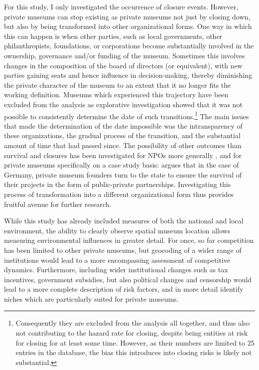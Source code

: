 \documentclass[12pt]{article}
\begin{document}
For this study, I only investigated the occurrence of closure events.
However, private museums can stop existing as private museums not just by closing down, but also by being transformed into other organizational forms.
One way in which this can happen is when other parties, such as local governments, other philanthropists, foundations, or corporations become substantially involved in the ownership, governance and/or funding of the museum.
Sometimes this involves changes in the composition of the board of directors (or equivalent), with new parties gaining seats and hence influence in decision-making, thereby diminishing the private character of the museum to an extent that it no longer fits the working definition.
Museums which experienced this trajectory have been excluded from the analysis as explorative investigation showed that it was not possible to consistently determine the date of such transitions.\footnote{Consequently they are excluded from the analysis all together, and thus also not contributing to the hazard rate for closing, despite being entities at risk for closing for at least some time. However, as their numbers are limited to 25 entries in the database, the bias this introduces into closing risks is likely not substantial.}
The main issues that made the determination of the date impossible was the intransparency of these organizations, the gradual process of the transition, and the substantial amount of time that had passed since.
The possibility of other outcomes than survival and closures has been investigated for NPOs more generally
\parencite{Searing_2020_zombies,HernandezOrtiz_2022_discontinuity,Helmig_Ingerfurth_Pinz_2013_nonprofit}, and for private museums specifically on a case study basis: 
\textcite{Walker_2019_collector} argues that in the case of Germany, private museum founders turn to the state to ensure the survival of their projects in the form of public-private partnerships.
Investigating this process of transformation into a different organizational form thus provides fruitful avenue for further research. 


While this study has already included measures of both the national and local environment, the ability to clearly observe spatial museum location allows measuring environmental influences in greater detail.
For once, so far competition has been limited to other private museums, but geocoding of a wider range of institutions would lead to a more encompassing assessment of competitive dynamics.
Furthermore, including wider institutional changes such as tax incentives, government subsidies, but also political changes and censorship would lead to a more complete description of risk factors, and in more detail identify niches which are particularly suited for private museums.


\begin{sloppypar}
\printbibliography
\end{sloppypar}
\end{document}
